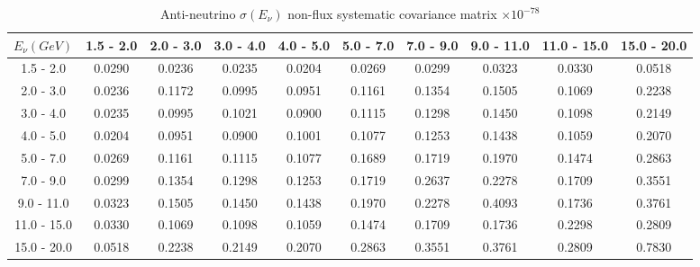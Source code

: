 \documentclass[aps,prl,twocolumn,showpacs,superscriptaddress,nofootinbib]{revtex4}
\begin{document}
\begingroup
\squeezetable
\begin{table}[h]
\tabcolsep=0.11cm
\begin{tabular}{c|ccccccccc}
$E_{\nu}(GeV)$ & 1.5 - 2.0 & 2.0 - 3.0 & 3.0 - 4.0 & 4.0 - 5.0 & 5.0 - 7.0 & 7.0 - 9.0 & 9.0 - 11.0 & 11.0 - 15.0 & 15.0 - 20.0\\
\hline
1.5 - 2.0 &0.0290	&0.0236	&0.0235	&0.0204	&0.0269	&0.0299	&0.0323	&0.0330	&0.0518	\\
2.0 - 3.0 &0.0236	&0.1172	&0.0995	&0.0951	&0.1161	&0.1354	&0.1505	&0.1069	&0.2238	\\
 3.0 - 4.0 &0.0235	&0.0995	&0.1021	&0.0900	&0.1115	&0.1298	&0.1450	&0.1098	&0.2149	\\
4.0 - 5.0 &0.0204	&0.0951	&0.0900	&0.1001	&0.1077	&0.1253	&0.1438	&0.1059	&0.2070	\\
5.0 - 7.0 &0.0269	&0.1161	&0.1115	&0.1077	&0.1689	&0.1719	&0.1970	&0.1474	&0.2863	\\
7.0 - 9.0 &0.0299	&0.1354	&0.1298	&0.1253	&0.1719	&0.2637	&0.2278	&0.1709	&0.3551	\\
9.0 - 11.0 &0.0323	&0.1505	&0.1450	&0.1438	&0.1970	&0.2278	&0.4093	&0.1736	&0.3761	\\
11.0 - 15.0 &0.0330	&0.1069	&0.1098	&0.1059	&0.1474	&0.1709	&0.1736	&0.2298	&0.2809	\\
15.0 - 20.0&0.0518	&0.2238	&0.2149	&0.2070	&0.2863	&0.3551	&0.3761	&0.2809	&0.7830	\\
  
\end{tabular}
\caption{Anti-neutrino $\sigma(E_\nu)$ non-flux systematic covariance matrix  $\times 10^{-78}$ }
\label{tab:enuB-nonflux}
\end{table}
\endgroup

\fi
\end{document}
